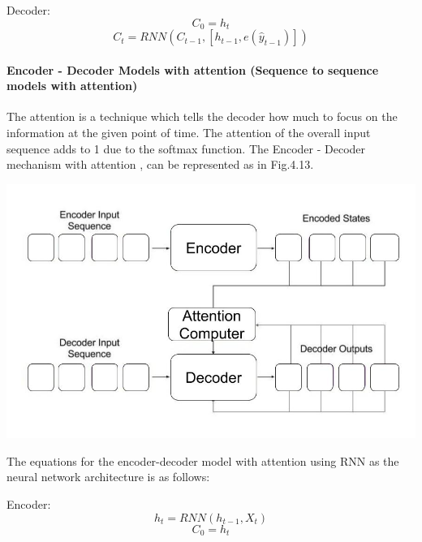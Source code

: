 Decoder: \begin{equation} C_{0} = h_{t}  \end{equation}	
		 \begin{equation} C_{t} = RNN(C_{t-1}, [h_{t-1}, e(\hat{y}_{t-1})])  \end{equation}


\paragraph{Encoder - Decoder Models with attention (Sequence to sequence models with attention)}

The attention is a technique which tells the decoder how much to focus on the information at the given point of time. The attention of the overall input sequence adds to 1 due to the softmax function. The Encoder - Decoder mechanism with attention \cite{2}, \cite{7} can be represented as in Fig.4.13.

				\begin{center}
				\includegraphics[width=\linewidth]{figures/Attention-Model.jpg}	
				\label{fig: Encoder - Decoder Mechanism with Attention}
				\end{center}

The equations for the encoder-decoder model with attention using RNN as the neural network architecture is as follows:

Encoder: \begin{equation} h_{t} = RNN(h_{t-1}, X_{t}) \end{equation}
		\begin{equation} C_{0} = h_{t}  \end{equation}

